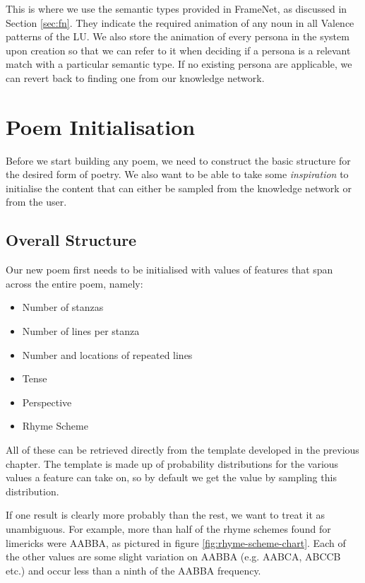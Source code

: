This is where we use the semantic types provided in FrameNet, as discussed in Section \ref{sec:fn}. They indicate the required animation of any noun in all Valence patterns of the LU. We also store the animation of every persona in the system upon creation so that we can refer to it when deciding if a persona is a relevant match with a particular semantic type. If no existing persona are applicable, we can revert back to finding one from our knowledge network.


\section{Poem Initialisation}

Before we start building any poem, we need to construct the basic structure for the desired form of poetry. We also want to be able to take some \textit{inspiration} to initialise the content that can either be sampled from the knowledge network or from the user.

\subsection{Overall Structure}
Our new poem first needs to be initialised with values of features that span across the entire poem, namely:
\begin{itemize}
\item{Number of stanzas}
\item{Number of lines per stanza}
\item{Number and locations of repeated lines}
\item{Tense}
\item{Perspective}
\item{Rhyme Scheme}
\end{itemize}

All of these can be retrieved directly from the template developed in the previous chapter. The template is made up of probability distributions for the various values a feature can take on, so by default we get the value by sampling this distribution. 

If one result is clearly more probably than the rest, we want to treat it as unambiguous. For example, more than half of the rhyme schemes found for limericks were AABBA, as pictured in figure \ref{fig:rhyme-scheme-chart}. Each of the other values are some slight variation on AABBA (e.g. AABCA, ABCCB etc.) and occur less than a ninth of the AABBA frequency.

